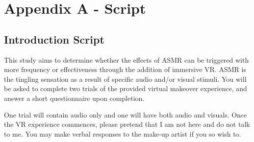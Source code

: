 \documentclass{sigchi}
\begin{document}

%
%
%
%
%
\balance{}

\balance{}




\appendix


\section{Appendix A - Script}
\label{appendix:script}
\subsection{Introduction Script}
This study aims to determine whether the effects of ASMR can be triggered with more frequency or effectiveness through the addition of immersive VR. ASMR is the tingling sensation as a result of specific audio and/or visual stimuli. You will be asked to complete two trials of the provided virtual makeover experience, and answer a short questionnaire upon completion.

One trial will contain audio only and one will have both audio and visuals. Once the VR experience commences, please pretend that I am not here and do not talk to me. You may make verbal responses to the make-up artist if you so wish to.
\end{document}
